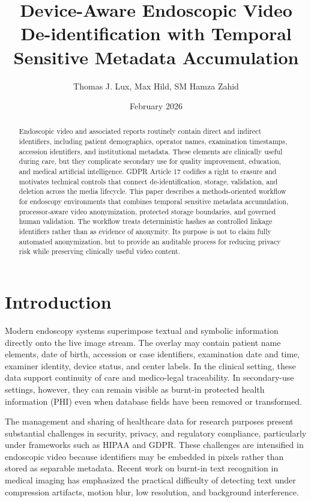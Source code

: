 \documentclass{article}
\begin{document}
\title{Device-Aware Endoscopic Video De-identification with Temporal Sensitive Metadata Accumulation}
\author{Thomas J. Lux, Max Hild, SM Hamza Zahid}
\date{February 2026}
\maketitle

\begin{abstract}
Endoscopic video and associated reports routinely contain direct and indirect
identifiers, including patient demographics, operator names, examination
timestamps, accession identifiers, and institutional metadata. These elements
are clinically useful during care, but they complicate secondary use for quality
improvement, education, and medical artificial intelligence. GDPR Article 17
codifies a right to erasure and motivates technical controls that connect
de-identification, storage, validation, and deletion across the media lifecycle.
\cite{gdpr} This paper describes a methods-oriented workflow for endoscopy
environments that combines temporal sensitive metadata accumulation,
processor-aware video anonymization, protected storage boundaries, and governed
human validation. The workflow treats deterministic hashes as controlled linkage
identifiers rather than as evidence of anonymity. Its purpose is not to claim
fully automated anonymization, but to provide an auditable process for reducing
privacy risk while preserving clinically useful video content.
\end{abstract}

\section{Introduction}
Modern endoscopy systems superimpose textual and symbolic information directly
onto the live image stream. The overlay may contain patient name elements, date
of birth, accession or case identifiers, examination date and time, examiner
identity, device status, and center labels. In the clinical setting, these data
support continuity of care and medico-legal traceability. In secondary-use
settings, however, they can remain visible as burnt-in protected health
information (PHI) even when database fields have been removed or transformed.

The management and sharing of healthcare data for research purposes present
substantial challenges in security, privacy, and regulatory compliance,
particularly under frameworks such as HIPAA and GDPR.
\cite{barbaria2025advancing}\cite{prakaashana2025measuring} These challenges
are intensified in endoscopic video because identifiers may be embedded in
pixels rather than stored as separable metadata. Recent work on burnt-in text
recognition in medical imaging has emphasized the practical difficulty of
detecting text under compression artifacts, motion blur, low resolution, and
background interference. \cite{osagie2024burnt}
\end{document}
